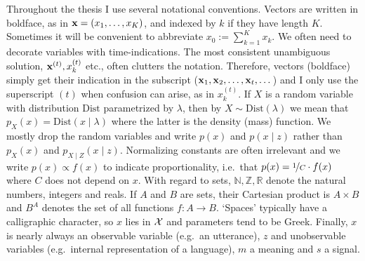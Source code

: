 \documentclass{../src/bcthesispart}
\begin{document}
Throughout the thesis I use several notational conventions.
Vectors are written in boldface, as in $\boldsymbol{\mathbf{x}} = (x_1, \dots, x_K)$, and indexed by $k$ if they have length $K$.
Sometimes it will be convenient to abbreviate $x_0 := \sum_{k=1}^K x_k$.
We often need to decorate variables with time-indications. The most consistent unambiguous solution, $\boldsymbol{\mathbf{x}}^{(t)}, x_k^{(t)}$ etc., often clutters the notation.
Therefore, vectors (boldface) simply get their indication in the subscript ($\boldsymbol{\mathbf{x}}_1, \boldsymbol{\mathbf{x}}_2, \dots, \boldsymbol{\mathbf{x}}_t, \dots$) and I only use the superscript $(t)$ when confusion can arise, as in $x_k^{(t)}$. 
If $X$ is a random variable with distribution $\text{Dist}$ parametrized by $\lambda$, then by $X \sim \text{Dist}(\lambda)$ we mean that $p_X(x) = \text{Dist}(x \mid \lambda)$ where the latter is the density (mass) function.
We mostly drop the random variables and write $p(x)$ and $p(x \mid z)$ rather than $p_X(x)$ and $p_{X\mid Z}(x \mid z)$.
Normalizing constants are often irrelevant and we write $p(x) \propto f(x)$ to indicate proportionality, i.e.\ that $p(x) = \nicefrac{1}{C} \cdot f(x)$ where $C$ does not depend on $x$.
With regard to sets, $\mathbb{N}, \mathbb{Z}, \mathbb{R}$ denote the natural numbers, integers and reals. 
If $A$ and $B$ are sets, their Cartesian product is $A\times B$ and $B^A$ denotes the set of all functions $f: A \to B$.
‘Spaces’ typically have a calligraphic character, so $x$ lies in $\mathcal{X}$ and parameters tend to be Greek.
Finally, $x$ is nearly always an observable variable (e.g.\ an utterance), $z$  and unobservable variables (e.g.\ internal representation of a language), $m$ a meaning and $s$ a signal.

\showbibliography
\end{document}
